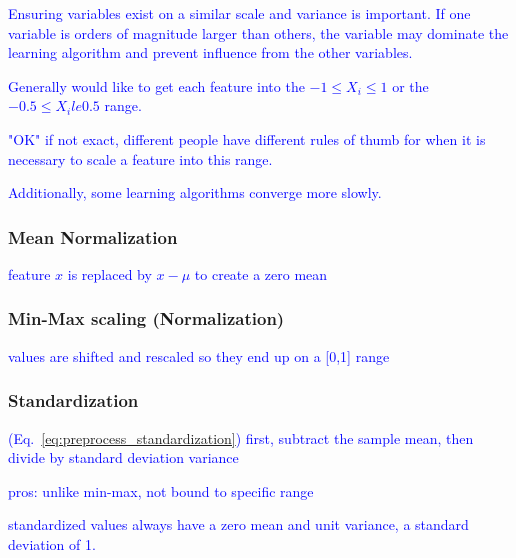 
\textcolor{blue}{Ensuring variables exist on a similar scale and variance is important. If one variable is orders of magnitude larger than others, the variable may dominate the learning algorithm and prevent influence from the other variables.}

\textcolor{blue}{Generally would like to get each feature into the $-1 \le X_i \le 1$ or the $-0.5 \le X_i le 0.5$ range.}

\textcolor{blue}{"OK" if not exact, different people have different rules of thumb for when it is necessary to scale a feature into this range.}

\textcolor{blue}{Additionally, some learning algorithms converge more slowly.}





\subsubsection{Mean Normalization}

\textcolor{blue}{feature $x$ is replaced by $x - \mu$ to create a zero mean}


\subsubsection{Min-Max scaling (Normalization)}

\textcolor{blue}{values are shifted and rescaled so they end up on a [0,1] range}

\subsubsection{Standardization}

\textcolor{blue}{(Eq.~\ref{eq:preprocess_standardization}) first, subtract the sample mean, then divide by standard deviation variance}

\textcolor{blue}{pros: unlike min-max, not bound to specific range}

\textcolor{blue}{standardized values always have a zero mean and unit variance, a standard deviation of 1.}

